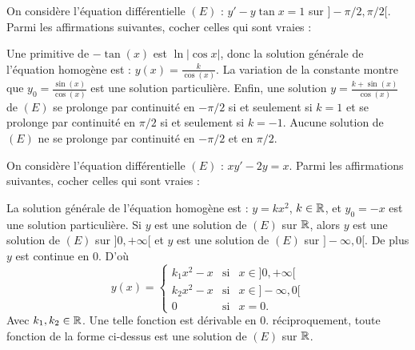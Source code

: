 \begin{question}
On considère l'équation différentielle $(E)$ : $y'-y\tan x=1$ sur $]-\pi/2,\pi /2[$. Parmi les affirmations suivantes, cocher celles qui sont vraies :
\begin{answers}  
\end{answers}
\begin{explanations}
Une primitive de $-\tan (x)$ est $\ln |\cos x|$, donc la solution générale de l'équation homogène est : $\displaystyle y(x)=\frac{k}{\cos (x)}$. La variation de la constante montre que $\displaystyle y_0=\frac{\sin (x)}{\cos (x)}$ est une solution particulière. Enfin, une solution $\displaystyle y=\frac{k+\sin (x)}{\cos (x)}$ de $(E)$ se prolonge par continuité en $-\pi/2$ si et seulement si $k=1$ et se prolonge par continuité en $\pi/2$ si et seulement si $k=-1$. Aucune solution de $(E)$ ne se prolonge par continuité en $-\pi/2$ et en $\pi /2$.
\end{explanations}
\end{question}

\begin{question}
On considère l'équation différentielle $(E)$ : $xy'-2y=x$. Parmi les affirmations suivantes, cocher celles qui sont vraies :
\begin{answers}  
\good{La solution générale de $(E)$ sur $]0,+\infty[$ est : $y=kx^2-x$, $k\in \Rr$.}
\good{La solution générale de $(E)$ sur $]-\infty,0[$ est : $y=kx^2-x$, $k\in \Rr$.}
\end{answers}
\begin{explanations}
La solution générale de l'équation homogène est : $y=kx^2$, $k\in \Rr$, et $y_0=-x$ est une solution particulière. Si $y$ est une solution de $(E)$ sur $\mathbb{R}$, alors $y$ est une solution de $(E)$ sur $]0,+\infty[$ et $y$ est une solution de $(E)$ sur $]-\infty,0[$. De plus $y$ est continue en $0$. D'où
$$y(x)=\left\{\begin{array}{lll}k_1x^2-x&\mbox{si}&x\in ]0,+\infty [ \\k_2x^2-x&\mbox{si}&x\in ]-\infty ,0[\\ 0&\mbox{si}&x=0. \end{array}\right.$$
Avec $k_1,k_2\in \mathbb{R}$. Une telle fonction est dérivable en $0$. réciproquement, toute fonction de la forme ci-dessus est une solution de $(E)$ sur $\mathbb{R}$.
\end{explanations}
\end{question}

